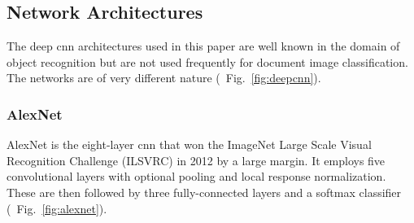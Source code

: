     



\subsection{Network Architectures}

The deep \ac{cnn} architectures used in this paper are well known in the domain of object recognition but are not used frequently for document image classification. The networks are of very different nature (\cf~Fig.~\ref{fig:deepcnn}).

\subsubsection{\textbf{AlexNet}}
AlexNet \cite{cnn_alexnet_nips2014} is the eight-layer \ac{cnn} that won the ImageNet Large Scale Visual Recognition Challenge (ILSVRC) in 2012 \cite{russakovsky2015imagenet} by a large margin.
It employs five convolutional layers with optional pooling and local response normalization. These are then followed by three fully-connected layers and a softmax classifier (\cf~Fig.~\ref{fig:alexnet}).

